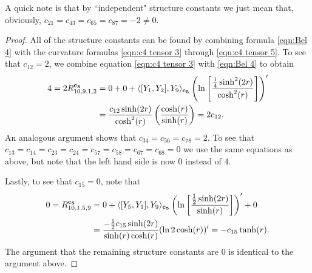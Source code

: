 \documentclass[10pt]{amsart}
\def\la{\langle}
\def\ra{\rangle}
\theoremstyle{definition}
\theoremstyle{remark}
\numberwithin{equation}{section}
\begin{document}
\vskip 10pt

A quick note is that by ``independent" structure constants we just mean that, obviously, $c_{21} = c_{43} = c_{65} = c_{87} = - 2 \neq 0$.

\begin{proof}
All of the structure constants can be found by combining formula \eqref{eqn:Bel 4} with the curvature formulas \eqref{eqn:c4 tensor 3} through \eqref{eqn:c4 tensor 5}.  
To see that $c_{12}= 2$, we combine equation \eqref{eqn:c4 tensor 3} with \eqref{eqn:Bel 4} to obtain
	\begin{align*}
	4 = 2R^{\bf c_5}_{10,9,1,2} &= 0 + 0 + \la [Y_1,Y_2],Y_9 \ra_{\bf c_5} \left( \ln \left[ \frac{\frac{1}{4} \sinh^2(2r)}{\cosh^2(r)} \right] \right)'  \\
	&= \frac{c_{12} \sinh(2r)}{\cosh^2(r)} \left( \frac{\cosh(r)}{\sinh(r)} \right)  = 2 c_{12}.
	\end{align*}
An analogous argument shows that $c_{34} = c_{56} = c_{78} = 2$.  
To see that $c_{13} = c_{14} = c_{23} = c_{24} = c_{57} = c_{58} = c_{67} = c_{68} = 0$ we use the same equations as above, but note that the left hand side is now $0$ instead of $4$.

Lastly, to see that $c_{15} = 0$, note that
	\begin{align*}
	0 = R^{\bf c_5}_{10,1,5,9} &= 0 + \la [Y_5,Y_1],Y_9 \ra_{\bf c_5} \left( \ln \left[ \frac{\frac{1}{2} \sinh(2r)}{\sinh(r)} \right] \right)' + 0  \\
	&= \frac{- \frac{1}{2} c_{15} \sinh(2r)}{\sinh(r) \cosh(r)} ( \ln 2 \cosh(r) )' = - c_{15} \tanh(r).
	\end{align*}
The argument that the remaining structure constants are $0$ is identical to the argument above.
\end{proof}
\end{document}
